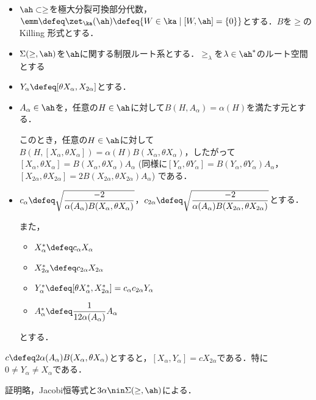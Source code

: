 \begin{nttdef}\label{nttdef:su21-red}
  \leavevmode
  \vspace{-1em}
  \begin{itemize}
  \item $\ah \subset \ge$を極大分裂可換部分代数，$\emm \defeq \zet_{\ka}(\ah) \defeq \{W\in \ka\mid [W,\ah] = \{0\} \} $とする．$B$を$\ge$のKilling 形式とする．
  \item $\Sigma(\ge,\ah) $を$\ah$に関する制限ルート系とする．$\ge_{\lambda} $を$\lambda\in \ah^{*}$のルート空間とする
  \item $Y_{\alpha}\defeq [\theta X_{\alpha}, X_{2\alpha}] $とする．
  \item $A_{\alpha}\in \ah $を，任意の$H\in \ah$に対して$B(H,A_{\alpha}) = \alpha(H) $を満たす元とする．
    
    このとき，任意の$H\in \ah$に対して$B(H, [X_{\alpha}, \theta X_{\alpha}]) = \alpha(H) B(X_{\alpha}, \theta X_{\alpha}) $，したがって$[X_{\alpha}, \theta X_{\alpha}] = B(X_{\alpha}, \theta X_{\alpha})A_{\alpha} $ (同様に$[Y_{\alpha}, \theta Y_{\alpha}]  = B(Y_{\alpha}, \theta Y_{\alpha})A_{\alpha} $，$ [X_{2\alpha}, \theta X_{2\alpha}] = 2B(X_{2\alpha}, \theta X_{2\alpha})A_{\alpha} $) である．
    \item $c_{\alpha}\defeq \sqrt{\dfrac{-2}{\alpha(A_{\alpha})B(X_{\alpha}, \theta X_{\alpha})}} $，$ c_{2\alpha}  \defeq \sqrt{\dfrac{-2}{\alpha(A_{\alpha})B(X_{2\alpha}, \theta X_{2\alpha})}} $とする．

    また，
    \begin{itemize}
    \item $X_{\alpha}^{*}\defeq c_{\alpha}X_{\alpha} $
    \item $X_{2\alpha}^{*}\defeq c_{2\alpha}X_{2\alpha} $
    \item $Y_{\alpha}^{*} \defeq [\theta X_{\alpha}^{*}, X_{2\alpha}^{*} ] = c_{\alpha}c_{2\alpha}Y_{\alpha} $
      \item $A_{\alpha}^{*}\defeq \dfrac{1}{12\alpha(A_{\alpha}) %
      }A_{\alpha} $
    \end{itemize}
    とする．
  \end{itemize}
\end{nttdef}

\begin{lem}\label{lem:3.2}
  $c \defeq 2\alpha(A_{\alpha})B(X_{\alpha},\theta X_{\alpha}) $とすると，$[X_{\alpha}, Y_{\alpha}] = cX_{2\alpha} $である．特に$0\neq Y_{\alpha}\neq X_{\alpha} $である．

  証明略，Jacobi恒等式と$3\alpha\nin \Sigma(\ge,\ah) $による．
\end{lem}

